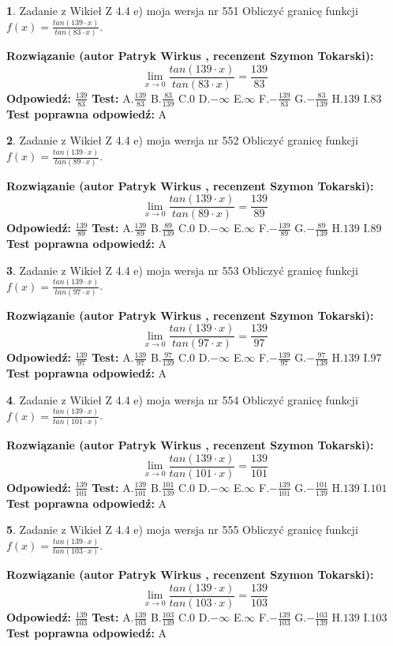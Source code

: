 \documentclass[12pt, a4paper]{article}
\theoremstyle{definition} %
\newtheorem{zad}{}
\newcommand{\zadStart}[1]{\begin{zad}#1\newline}
\newcommand{\zadStop}{\end{zad}}
\newcommand{\rozwStart}[2]{\noindent \textbf{Rozwiązanie (autor #1 , recenzent #2): }\newline}
\newcommand{\rozwStop}{\newline}
\newcommand{\odpStart}{\noindent \textbf{Odpowiedź:}\newline}
\newcommand{\odpStop}{\newline}
\newcommand{\testStart}{\noindent \textbf{Test:}\newline}
\newcommand{\testStop}{\newline}
\newcommand{\kluczStart}{\noindent \textbf{Test poprawna odpowiedź:}\newline}
\newcommand{\kluczStop}{\newline}
\begin{document}
\zadStart{Zadanie z Wikieł Z 4.4 e) moja wersja nr 551}
Obliczyć granicę funkcji $f(x)=\frac{tan(139\cdot x)}{tan(83\cdot x)}$.
\zadStop
\rozwStart{Patryk Wirkus}{Szymon Tokarski}
$$\lim\limits_{x\to 0}\frac{tan(139\cdot x)}{tan(83\cdot x)}=
\frac{139}{83}$$
\rozwStop
\odpStart
$\frac{139}{83}$
\odpStop
\testStart
A.$\frac{139}{83}$
B.$\frac{83}{139}$
C.$0$
D.$-\infty$
E.$\infty$
F.$-\frac{139}{83}$
G.$-\frac{83}{139}$
H.$139$
I.$83$
\testStop
\kluczStart
A
\kluczStop



\zadStart{Zadanie z Wikieł Z 4.4 e) moja wersja nr 552}
Obliczyć granicę funkcji $f(x)=\frac{tan(139\cdot x)}{tan(89\cdot x)}$.
\zadStop
\rozwStart{Patryk Wirkus}{Szymon Tokarski}
$$\lim\limits_{x\to 0}\frac{tan(139\cdot x)}{tan(89\cdot x)}=
\frac{139}{89}$$
\rozwStop
\odpStart
$\frac{139}{89}$
\odpStop
\testStart
A.$\frac{139}{89}$
B.$\frac{89}{139}$
C.$0$
D.$-\infty$
E.$\infty$
F.$-\frac{139}{89}$
G.$-\frac{89}{139}$
H.$139$
I.$89$
\testStop
\kluczStart
A
\kluczStop



\zadStart{Zadanie z Wikieł Z 4.4 e) moja wersja nr 553}
Obliczyć granicę funkcji $f(x)=\frac{tan(139\cdot x)}{tan(97\cdot x)}$.
\zadStop
\rozwStart{Patryk Wirkus}{Szymon Tokarski}
$$\lim\limits_{x\to 0}\frac{tan(139\cdot x)}{tan(97\cdot x)}=
\frac{139}{97}$$
\rozwStop
\odpStart
$\frac{139}{97}$
\odpStop
\testStart
A.$\frac{139}{97}$
B.$\frac{97}{139}$
C.$0$
D.$-\infty$
E.$\infty$
F.$-\frac{139}{97}$
G.$-\frac{97}{139}$
H.$139$
I.$97$
\testStop
\kluczStart
A
\kluczStop



\zadStart{Zadanie z Wikieł Z 4.4 e) moja wersja nr 554}
Obliczyć granicę funkcji $f(x)=\frac{tan(139\cdot x)}{tan(101\cdot x)}$.
\zadStop
\rozwStart{Patryk Wirkus}{Szymon Tokarski}
$$\lim\limits_{x\to 0}\frac{tan(139\cdot x)}{tan(101\cdot x)}=
\frac{139}{101}$$
\rozwStop
\odpStart
$\frac{139}{101}$
\odpStop
\testStart
A.$\frac{139}{101}$
B.$\frac{101}{139}$
C.$0$
D.$-\infty$
E.$\infty$
F.$-\frac{139}{101}$
G.$-\frac{101}{139}$
H.$139$
I.$101$
\testStop
\kluczStart
A
\kluczStop



\zadStart{Zadanie z Wikieł Z 4.4 e) moja wersja nr 555}
Obliczyć granicę funkcji $f(x)=\frac{tan(139\cdot x)}{tan(103\cdot x)}$.
\zadStop
\rozwStart{Patryk Wirkus}{Szymon Tokarski}
$$\lim\limits_{x\to 0}\frac{tan(139\cdot x)}{tan(103\cdot x)}=
\frac{139}{103}$$
\rozwStop
\odpStart
$\frac{139}{103}$
\odpStop
\testStart
A.$\frac{139}{103}$
B.$\frac{103}{139}$
C.$0$
D.$-\infty$
E.$\infty$
F.$-\frac{139}{103}$
G.$-\frac{103}{139}$
H.$139$
I.$103$
\testStop
\kluczStart
A
\kluczStop
\end{document}
